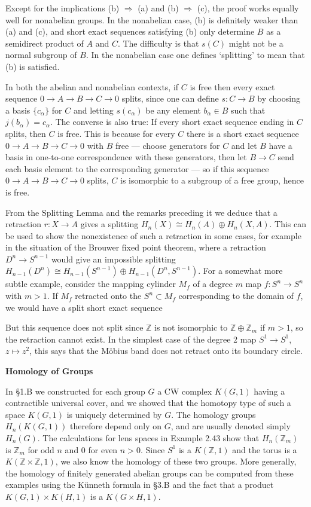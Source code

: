 Except for the implications (b) $\Rightarrow$ (a) and (b) $\Rightarrow$ (c), the proof works equally well for nonabelian groups. In the nonabelian case, (b) is definitely weaker than (a) and (c), and short exact sequences satisfying (b) only determine $B$ as a semidirect product of $A$ and $C$. The difficulty is that $s(C)$ might not be a normal subgroup of $B$. In the nonabelian case one defines `splitting' to mean that (b) is satisfied.

In both the abelian and nonabelian contexts, if $C$ is free then every exact sequence $0 \to A \to B \to C \to 0$ splits, since one can define $s : C \to B$ by choosing a basis $\{c_\alpha\}$ for $C$ and letting $s(c_\alpha)$ be any element $b_\alpha \in B$ such that $j(b_\alpha) = c_\alpha$. The converse is also true: If every short exact sequence ending in $C$ splits, then $C$ is free. This is because for every $C$ there is a short exact sequence $0 \to A \to B \to C \to 0$ with $B$ free --- choose generators for $C$ and let $B$ have a basis in one-to-one correspondence with these generators, then let $B \to C$ send each basis element to the corresponding generator --- so if this sequence $0 \to A \to B \to C \to 0$ splits, $C$ is isomorphic to a subgroup of a free group, hence is free.

From the Splitting Lemma and the remarks preceding it we deduce that a retraction $r : X \to A$ gives a splitting $H_n(X) \cong H_n(A) \oplus H_n(X,A)$. This can be used to show the nonexistence of such a retraction in some cases, for example in the situation of the Brouwer fixed point theorem, where a retraction $D^n \to S^{n-1}$ would give an impossible splitting $H_{n-1}(D^n) \cong H_{n-1}(S^{n-1}) \oplus H_{n-1}(D^n, S^{n-1})$. For a somewhat more subtle example, consider the mapping cylinder $M_f$ of a degree $m$ map $f : S^n \to S^n$ with $m > 1$. If $M_f$ retracted onto the $S^n \subset M_f$ corresponding to the domain of $f$, we would have a split short exact sequence



But this sequence does not split since $\mathbb{Z}$ is not isomorphic to $\mathbb{Z} \oplus \mathbb{Z}_m$ if $m > 1$, so the retraction cannot exist. In the simplest case of the degree 2 map $S^1 \to S^1$, $z \mapsto z^2$, this says that the M\"obius band does not retract onto its boundary circle.

\textbf{Homology of Groups}

In \S1.B we constructed for each group $G$ a CW complex $K(G,1)$ having a contractible universal cover, and we showed that the homotopy type of such a space $K(G,1)$ is uniquely determined by $G$. The homology groups $H_n(K(G,1))$ therefore depend only on $G$, and are usually denoted simply $H_n(G)$. The calculations for lens spaces in Example 2.43 show that $H_n(\mathbb{Z}_m)$ is $\mathbb{Z}_m$ for odd $n$ and $0$ for even $n > 0$. Since $S^1$ is a $K(\mathbb{Z},1)$ and the torus is a $K(\mathbb{Z} \times \mathbb{Z},1)$, we also know the homology of these two groups. More generally, the homology of finitely generated abelian groups can be computed from these examples using the K\"unneth formula in \S3.B and the fact that a product $K(G,1) \times K(H,1)$ is a $K(G \times H,1)$.

